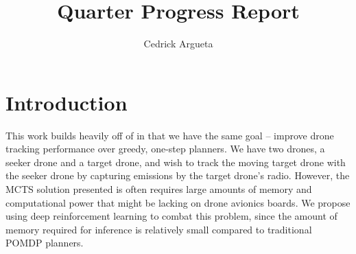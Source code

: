 \documentclass{article}
\begin{document}
\title{Quarter Progress Report}
\author{Cedrick Argueta}

\maketitle

\begin{comment}

\section{Introduction}
Tomorrow morning is fine. I'd say closer to a summary of what you learned. It would still be good to include some background and what the goal is (since he probably isn't as familiar as we are). After highlighting the goal, let him know how you are approaching the problem and what you have accomplished so far. Feel free to let him know what problems you ran into and how you overcame them. 


\section{Introduction}


previous work: Kyle's paper on distributed wildfire with drones, louis' paper on drone localization

what i've done so far:
    read the papers
    done some simple examples with louis' FEBOL module
    set up dev environment locally
    developed system to train RL models on the FEBOL code easily
    moved system onto astoria
    
stuff ive learned:
    gone in depth on more advanced reinforcement learning than cs221
    working with FEBOL and the mathematics behind kyle's and louis' papers
    more advanced RL setups with keras rl

\end{comment}

\section{Introduction}
This work builds heavily off of \cite{dronehunter} in that we have the same goal -- improve drone tracking performance over greedy, one-step planners.
We have two drones, a seeker drone and a target drone, and wish to track the moving target drone with the seeker drone by capturing emissions by the target drone's radio.
However, the MCTS solution presented is often requires large amounts of memory and computational power that might be lacking on drone avionics boards.
We propose using deep reinforcement learning to combat this problem, since the amount of memory required for inference is relatively small compared to traditional POMDP planners.
\end{document}

